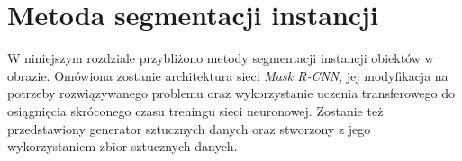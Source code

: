 \chapter{Metoda segmentacji instancji}
W niniejszym rozdziale przybliżono metody segmentacji instancji obiektów w obrazie.
Omówiona zostanie architektura sieci \textit{Mask R-CNN}, jej modyfikacja na potrzeby rozwiązywanego problemu oraz wykorzystanie uczenia transferowego do osiągnięcia skróconego czasu treningu sieci neuronowej.
Zostanie też przedstawiony generator sztucznych danych oraz stworzony z jego wykorzystaniem zbior sztucznych danych.
